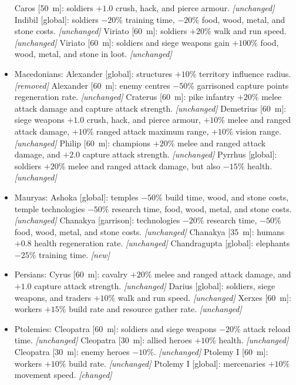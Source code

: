 \documentclass{article}
\begin{document}
\begin{itemize}
  \subitem Caros [50~m]: soldiers $+1.0$ crush, hack, and pierce armour. \emph{[unchanged]}
  \subitem Indibil [global]: soldiers $-20\%$ training time, $-20\%$ food, wood, metal, and stone costs. \emph{[unchanged]}
  \subitem Viriato [60~m]: soldiers $+20\%$ walk and run speed. \emph{[unchanged]}
  \subitem Viriato [60~m]: soldiers and siege weapons gain $+100\%$ food, wood, metal, and stone in loot. \emph{[unchanged]}
  \item Macedonians:
  \subitem Alexander [global]: structures $+10\%$ territory influence radius. \emph{[removed]}
  \subitem Alexander [60~m]: enemy centres $-50\%$ garrisoned capture points regeneration rate. \emph{[unchanged]}
  \subitem Craterus [60~m]: pike infantry  $+20\%$ melee attack damage and capture attack strength. \emph{[unchanged]}
  \subitem Demetrius [60~m]: siege weapons $+1.0$ crush, hack, and pierce armour, $+10\%$ melee and ranged attack damage, $+10\%$ ranged attack maximum range, $+10\%$ vision range. \emph{[unchanged]}
  \subitem Philip [60~m]: champions $+20\%$ melee and ranged attack damage, and $+2.0$ capture attack strength. \emph{[unchanged]}
  \subitem Pyrrhus [global]: soldiers $+20\%$ melee and ranged attack damage, but also $-15\%$ health. \emph{[unchanged]}
  \item Mauryas:
  \subitem Ashoka [global]: temples $-50\%$ build time, wood, and stone costs, temple technologies $-50\%$ research time, food, wood, metal, and stone costs. \emph{[unchanged]}
  \subitem Chanakya [garrison]: technologies $-20\%$ research time, $-50\%$ food, wood, metal, and stone costs. \emph{[unchanged]}
  \subitem Chanakya [35~m]: humans $+0.8$ health regeneration rate. \emph{[unchanged]}
  \subitem Chandragupta [global]: elephants $-25\%$ training time. \emph{[new]}
  \item Persians:
  \subitem Cyrus [60~m]: cavalry $+20\%$ melee and ranged attack damage, and $+1.0$ capture attack strength. \emph{[unchanged]}
  \subitem Darius [global]: soldiers, siege weapons, and traders $+10\%$ walk and run speed. \emph{[unchanged]}
  \subitem Xerxes [60~m]: workers $+15\%$ build rate and resource gather rate. \emph{[unchanged]}
  \item Ptolemies:
  \subitem Cleopatra [60~m]: soldiers and siege weapons $-20\%$ attack reload time. \emph{[unchanged]}
  \subitem Cleopatra [30~m]: allied heroes $+10\%$ health. \emph{[unchanged]}
  \subitem Cleopatra [30~m]: enemy heroes $-10\%$. \emph{[unchanged]}
  \subitem Ptolemy I [60~m]: workers $+10\%$ build rate. \emph{[unchanged]}
  \subitem Ptolemy I [global]: mercenaries $+10\%$ movement speed. \emph{[changed]} %

\end{itemize}
\end{document}
